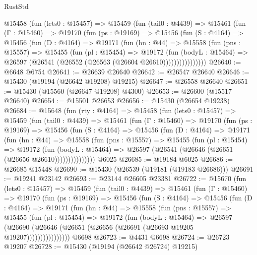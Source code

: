 \begin{lexlean}{RustStd}
\begin{coremodule}
      @15458
        (fun (lets0 : @15457) =>
        @15459
          (fun (tail0 : @4439) =>
          @15461
            (fun (Γ : @15460) =>
            @19170
              (fun (ps : @19169) =>
              @15456
                (fun (S : @4164) =>
                @15456
                  (fun (D : @4164) =>
                  @19171
                    (fun (hn : @44) =>
                    @15558
                      (fun (pns : @15557) =>
                      @15455
                        (fun (pl : @15454) =>
                        @19172
                          (fun (bodyL : @15464) =>
                          @26597 (@26541 (@26552 (@26563 (@26604 @26610))))))))))))))))
@26640 := @6648 @6754
@26641 := @26639 @26640
@26642 := @26547 @26640
@26646 := @15430 (@19194 (@26642 @19208) @19215)
@26647 := @26558 @26640
@26651 := @15430 (@15560 (@26647 @19208) @4300)
@26653 := @26600 (@15517 @26640)
@26654 := @15501 @26653
@26656 := @15430 (@26654 @19238)
@26684 := @15648
    (fun (rty : @4164) =>
    @15458
      (fun (lets0 : @15457) =>
      @15459
        (fun (tail0 : @4439) =>
        @15461
          (fun (Γ : @15460) =>
          @19170
            (fun (ps : @19169) =>
            @15456
              (fun (S : @4164) =>
              @15456
                (fun (D : @4164) =>
                @19171
                  (fun (hn : @44) =>
                  @15558
                    (fun (pns : @15557) =>
                    @15455
                      (fun (pl : @15454) =>
                      @19172
                        (fun (bodyL : @15464) =>
                        @26597 (@26541 (@26646 (@26651 (@26656 @26610)))))))))))))))
    @6025
@26685 := @19184 @6025
@26686 := @26685 @15448
@26690 := @15430 (@26539 (@19181 (@19183 @26686)))
@26691 := @19241 @23142
@26693 := @23144 @26605 @23381
@26722 := @15670
    (fun (lets0 : @15457) =>
    @15459
      (fun (tail0 : @4439) =>
      @15461
        (fun (Γ : @15460) =>
        @19170
          (fun (ps : @19169) =>
          @15456
            (fun (S : @4164) =>
            @15456
              (fun (D : @4164) =>
              @19171
                (fun (hn : @44) =>
                @15558
                  (fun (pns : @15557) =>
                  @15455
                    (fun (pl : @15454) =>
                    @19172
                      (fun (bodyL : @15464) =>
                      @26597
                        (@26690
                          (@26646 (@26651 (@26656 (@26691 (@26693 @19205 @19207))))))))))))))))
    @6698
@26723 := @4431 @6698
@26724 := @26723 @19207
@26728 := @15430 (@19194 (@26642 @26724) @19215)

\end{coremodule}
\end{lexlean}
